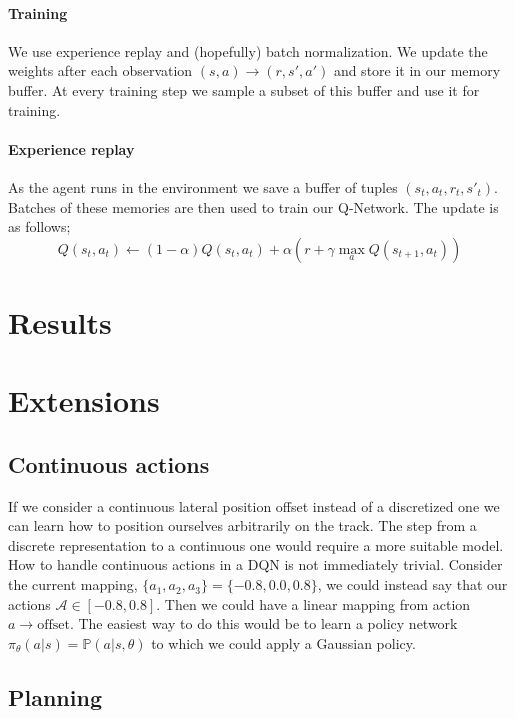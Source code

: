 \documentclass{article}
\begin{document}
\paragraph{Training}

We use experience replay and (hopefully) batch normalization. We update the weights after each observation $(s,a) \rightarrow (r,s',a')$ and store it in our memory buffer. At every training step we sample a subset of this buffer and use it for training.

\paragraph{Experience replay}

As the agent runs in the environment we save a buffer of tuples $(s_t, a_t, r_t, s'_t)$. Batches of these memories are then used to train our Q-Network. The update is as follows;
\[
	Q(s_t, a_t) \leftarrow  (1-\alpha)Q(s_t, a_t) + \alpha(r + \gamma \max_a Q(s_{t+1}, a_t))
\]

\section{Results}

\section{Extensions}

\subsection{Continuous actions}

If we consider a continuous lateral position offset instead of a discretized one we can learn how to position ourselves arbitrarily on the track. The step from a discrete representation to a continuous one would require a more suitable model. How to handle continuous actions in a DQN is not immediately trivial.  Consider the current mapping, $\{a_1,a_2,a_3\} = \{-0.8, 0.0, 0.8\}$, we could instead say that our actions $\mathcal{A} \in [-0.8,0.8]$. Then we could have a linear mapping from action $a \rightarrow \text{offset}$. The easiest way to do this would be to learn a policy network $\pi_\theta(a|s) = \mathbb{P}(a | s, \theta)$ to which we could apply a Gaussian policy.

\subsection{Planning}
\end{document}
